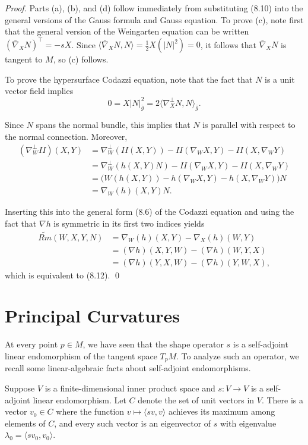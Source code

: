 \begin{proof}
Parts (a), (b), and (d) follow immediately from substituting (8.10) into the general versions of the Gauss formula and Gauss equation. To prove (c), note first that the general version of the Weingarten equation can be written $(\bar{\nabla}_X N)^{\top} = -sX$. Since $\langle \bar{\nabla}_X N, N \rangle = \frac{1}{2}X(|N|^2) = 0$, it follows that $\bar{\nabla}_X N$ is tangent to $M$, so (c) follows.

To prove the hypersurface Codazzi equation, note that the fact that $N$ is a unit vector field implies
\[
0 = X|N|^2_{\bar{g}} = 2\langle \nabla^{\perp}_X N, N \rangle_{\bar{g}}.
\]

Since $N$ spans the normal bundle, this implies that $N$ is parallel with respect to the normal connection. Moreover,
\begin{align*}
(\nabla_W^\perp II)(X, Y) &= \nabla_W^\perp(II(X,Y)) - II(\nabla_W X, Y) - II(X, \nabla_W Y)\\
&= \nabla_W^\perp(h(X, Y)N) - II(\nabla_W X, Y) - II(X, \nabla_W Y)\\
&= \bigl(W(h(X, Y)) - h(\nabla_W X, Y) - h(X, \nabla_W Y)\bigr)N\\
&= \nabla_W(h)(X, Y)N.
\end{align*}

Inserting this into the general form (8.6) of the Codazzi equation and using the fact that $\nabla h$ is symmetric in its first two indices yields
\begin{align*}
\widetilde{Rm}(W, X, Y, N) &= \nabla_W(h)(X, Y) - \nabla_X(h)(W, Y)\\
&= (\nabla h)(X, Y, W) - (\nabla h)(W, Y, X)\\
&= (\nabla h)(Y, X, W) - (\nabla h)(Y, W, X),
\end{align*}
which is equivalent to (8.12). \qed
\end{proof}

\section{Principal Curvatures}

At every point $p \in M$, we have seen that the shape operator $s$ is a self-adjoint linear endomorphism of the tangent space $T_p M$. To analyze such an operator, we recall some linear-algebraic facts about self-adjoint endomorphisms.

\begin{lemma}
\label{lem:self-adjoint-eigenvector-extremum}
Suppose $V$ is a finite-dimensional inner product space and $s: V \to V$ is a self-adjoint linear endomorphism. Let $C$ denote the set of unit vectors in $V$. There is a vector $v_0 \in C$ where the function $v \mapsto \langle sv, v \rangle$ achieves its maximum among elements of $C$, and every such vector is an eigenvector of $s$ with eigenvalue $\lambda_0 = \langle sv_0, v_0 \rangle$.
\end{lemma}

